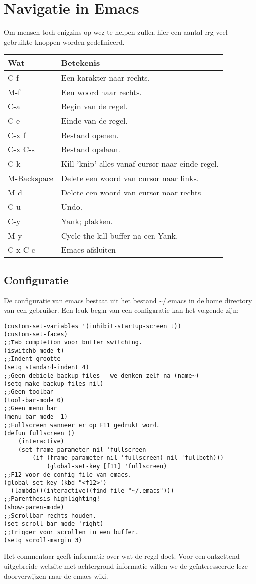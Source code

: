 \section{Navigatie in Emacs}
Om mensen toch enigzins op weg te helpen zullen hier een aantal erg veel gebruikte knoppen worden gedefinieerd.\\
\begin{tabular}[t]{ll}
  \hline
  Wat & Betekenis\\
  \hline
  C-f & Een karakter naar rechts\footnotemark.\\
  M-f & Een woord naar rechts\footnotemark.\\
  C-a & Begin van de regel.\\
  C-e & Einde van de regel.\\
  C-x f & Bestand openen.\\
  C-x C-s & Bestand opslaan.\\
  C-k & Kill 'knip' alles vanaf cursor naar einde regel.\\
  M-Backspace & Delete een woord van cursor naar links.\\
  M-d & Delete een woord van cursor naar rechts.\\
  C-u & Undo.\\
  C-y & Yank; plakken.\\
  M-y & Cycle the kill buffer na een Yank.\\
  C-x C-c & Emacs afsluiten\\
\end{tabular}

\subsection{Configuratie}
De configuratie van emacs bestaat uit het bestand \~{}/.emacs in de home directory van een gebruiker. Een leuk begin van een configuratie kan het volgende zijn:
\begin{lstlisting}
(custom-set-variables '(inhibit-startup-screen t))
(custom-set-faces)
;;Tab completion voor buffer switching. 
(iswitchb-mode t)
;;Indent grootte
(setq standard-indent 4)
;;Geen debiele backup files - we denken zelf na (name~)
(setq make-backup-files nil)
;;Geen toolbar
(tool-bar-mode 0)
;;Geen menu bar
(menu-bar-mode -1)
;;Fullscreen wanneer er op F11 gedrukt word. 
(defun fullscreen ()
    (interactive)
    (set-frame-parameter nil 'fullscreen
        (if (frame-parameter nil 'fullscreen) nil 'fullboth)))
            (global-set-key [f11] 'fullscreen)
;;F12 voor de config file van emacs. 
(global-set-key (kbd "<f12>") 
  (lambda()(interactive)(find-file "~/.emacs")))
;;Parenthesis highlighting!
(show-paren-mode)
;;Scrollbar rechts houden. 
(set-scroll-bar-mode 'right)
;;Trigger voor scrollen in een buffer.
(setq scroll-margin 3)
\end{lstlisting}
Het commentaar geeft informatie over wat de regel doet. Voor een ontzettend uitgebreide website met achtergrond informatie willen we de ge\"{i}nteresseerde leze doorverwijzen naar de emacs wiki\cite{bib.emacs.ewiki}.
